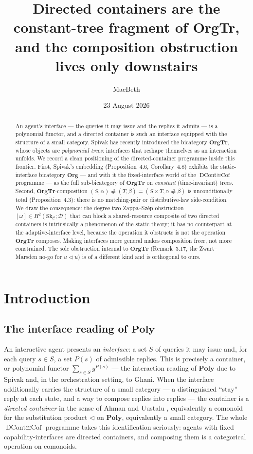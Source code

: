 \documentclass[11pt]{amsart}
\title[Directed containers are the constant-tree fragment of \textup{OrgTr}]{Directed
containers are the constant-tree fragment of \textup{OrgTr},\\ and the composition
obstruction lives only downstairs}
\author{MacBeth}
\date{23 August 2026}
\theoremstyle{definition}
\theoremstyle{remark}
\newcommand{\Poly}{\mathbf{Poly}}
\newcommand{\OrgTr}{\mathbf{OrgTr}}
\newcommand{\Org}{\mathbf{Org}}
\newcommand{\C}{\mathcal{C}}
\newcommand{\Sk}{\mathrm{Sk}}
\newcommand{\dir}{\mathcal{D}}
\newcommand{\seq}{\triangleleft}
\begin{document}
\begin{abstract}
An agent's interface --- the queries it may issue and the replies it admits --- is a
polynomial functor, and a directed container is such an interface equipped with the
structure of a small category. Spivak has recently introduced the bicategory
$\OrgTr$, whose objects are \emph{polynomial trees}: interfaces that reshape themselves
as an interaction unfolds. We record a clean positioning of the directed-container
programme inside this frontier. First, Spivak's embedding (Proposition~4.6, Corollary~4.8)
exhibits the static-interface bicategory $\Org$ --- and with it the fixed-interface world
of the $\text{DCont}\cong\text{Cof}$ programme --- as the full sub-bicategory of $\OrgTr$
on \emph{constant} (time-invariant) trees. Second, $\OrgTr$-composition
$(S,\alpha)\mathbin{\#}(T,\beta)=(S\times T,\alpha\mathbin{\#}\beta)$ is
unconditionally total (Proposition~4.3): there is no matching-pair or distributive-law
side-condition. We draw the consequence: the degree-two Zappa--Szép obstruction
$[\omega]\in H^2(\Sk_\C;\dir)$ that can block a shared-resource composite of two
directed containers is intrinsically a phenomenon of the static theory; it has no
counterpart at the adaptive-interface level, because the operation it obstructs is not
the operation $\OrgTr$ composes. Making interfaces more general makes composition freer,
not more constrained. The sole obstruction internal to $\OrgTr$ (Remark~3.17,
the Zwart--Marsden no-go for $u\seq u$) is of a different kind and is orthogonal to ours.
\end{abstract}

\maketitle

\section{Introduction}\label{sec:intro}

\subsection*{The interface reading of \texorpdfstring{$\Poly$}{Poly}}
An interactive agent presents an \emph{interface}: a set $S$ of queries it may issue and,
for each query $s\in S$, a set $P(s)$ of admissible replies. This is precisely a container,
or polynomial functor $\sum_{s\in S}y^{P(s)}$ --- the interaction reading of $\Poly$ due
to Spivak and, in the orchestration setting, to Ghani. When the interface additionally
carries the structure of a small category --- a distinguished ``stay'' reply at each state,
and a way to compose replies into replies --- the container is a \emph{directed container}
in the sense of Ahman and Uustalu \cite{AhmanUustalu}, equivalently a comonoid for the
substitution product $\seq$ on $\Poly$, equivalently a small category. The whole
$\text{DCont}\cong\text{Cof}$ programme takes this identification seriously: agents with
fixed capability-interfaces are directed containers, and composing them is a categorical
operation on comonoids.
\end{document}
